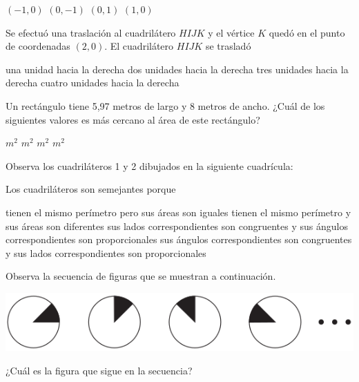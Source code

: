 \documentclass[addpoints]{exam}
\begin{document}
\begin{multicols}{2}
\begin{questions}
  \begin{oneparchoices}
  \choice $ (-1,0) $ \choice $ (0,-1) $ \choice $ (0,1) $ \CorrectChoice $ (1,0) $  
  \end{oneparchoices}
\question Se efectuó una traslación al cuadrilátero $ HIJK $ y el vértice $ K $ quedó en el punto de coordenadas $ (2,0) $. El cuadrilátero $ HIJK $ se trasladó \label{q02}
\begin{choices}
  \choice una unidad hacia la derecha
  \choice dos unidades hacia la derecha
  \CorrectChoice tres unidades hacia la derecha
  \choice cuatro unidades hacia la derecha
\end{choices}
\question Un rectángulo tiene 5,97 metros de largo y 8 metros de ancho. ¿Cuál de los siguientes valores es más cercano al área de este rectángulo?
\begin{choices}
 $m^{2}$
 $m^{2}$
 $m^{2}$
 $m^{2}$
\end{choices}
\question Observa los cuadriláteros 1 y 2 dibujados en la siguiente cuadrícula:
\begin{center}
\end{center}
Los cuadriláteros son semejantes porque
\begin{choices}
\choice tienen el mismo perímetro pero sus áreas son iguales
\choice tienen el mismo perímetro y sus áreas son diferentes
\choice sus lados correspondientes son congruentes y sus ángulos correspondientes son proporcionales
\CorrectChoice sus ángulos correspondientes son congruentes y sus lados correspondientes son proporcionales
\end{choices}
\question Observa la secuencia de figuras que se muestran a continuación.
\begin{center}
\includegraphics[scale=.30]{Images/Pantallazo-28.png} 
\end{center}
¿Cuál es la figura que sigue en la secuencia?


\end{questions}
\end{multicols}
\end{document}
